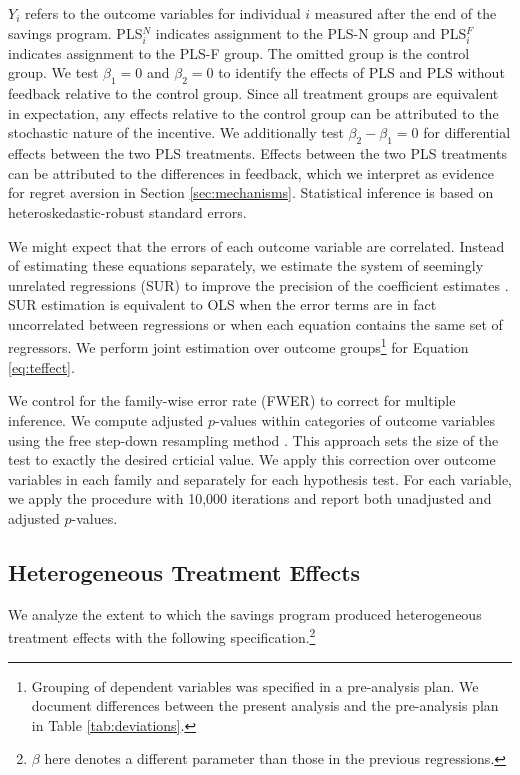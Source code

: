 \documentclass[12pt, titlepage]{article}
\begin{document}
		$Y_{i}$ refers to the outcome variables for individual $i$ measured after the end of the savings program. PLS$^N_i$ indicates assignment to the PLS-N group and PLS$^F_i$ indicates assignment to the PLS-F group. The omitted group is the control group. We test $\beta_{1} = 0$ and $\beta_{2} = 0$ to identify the effects of PLS and PLS without feedback relative to the control group. Since all treatment groups are equivalent in expectation, any effects relative to the control group can be attributed to the stochastic nature of the incentive. We additionally test $\beta_{2} - \beta_{1} = 0$ for differential effects between the two PLS treatments. Effects between the two PLS treatments can be attributed to the differences in feedback, which we interpret as evidence for regret aversion in Section \ref{sec:mechanisms}. Statistical inference is based on heteroskedastic-robust standard errors.

		We might expect that the errors of each outcome variable are correlated. Instead of estimating these equations separately, we estimate the system of seemingly unrelated regressions (SUR) to improve the precision of the coefficient estimates \parencite{zellner_efficient_1962}. SUR estimation is equivalent to OLS when the error terms are in fact uncorrelated between regressions or when each equation contains the same set of regressors. We perform joint estimation over outcome groups\footnote{Grouping of dependent variables was specified in a pre-analysis plan. We document differences between the present analysis and the pre-analysis plan in Table \ref{tab:deviations}.} for Equation \ref{eq:teffect}.

		We control for the family-wise error rate (FWER) to correct for multiple inference. We compute adjusted $p$-values within categories of outcome variables using the free step-down resampling method \parencite{westfall_resampling-based_1993,anderson_multiple_2008}. This approach sets the size of the test to exactly the desired crticial value. We apply this correction over outcome variables in each family and separately for each hypothesis test. For each variable, we apply the procedure with 10,000 iterations and report both unadjusted and adjusted $p$-values.

	\subsection{Heterogeneous Treatment Effects}

		We analyze the extent to which the savings program produced heterogeneous treatment effects with the following specification.\footnote{$\beta$ here denotes a different parameter than those in the previous regressions.}
\end{document}
